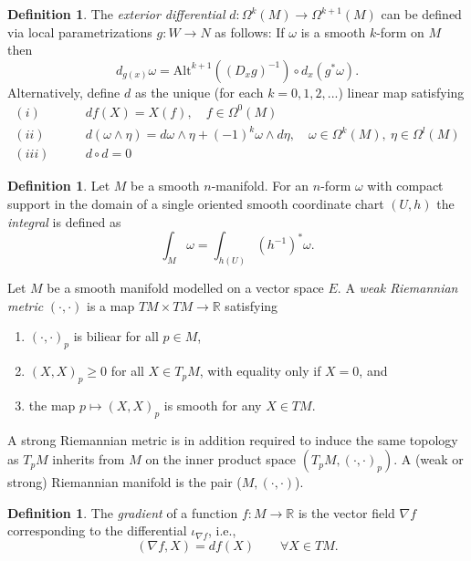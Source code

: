 \documentclass{article}
\theoremstyle{plain}
\theoremstyle{definition}
\newtheorem{defin}[teo]{Definition}
\numberwithin{equation}{section}
\newcommand{\R}{\ensuremath{\mathbb{R}}}
\newcommand{\Alt}{\ensuremath{\mathrm{Alt}}}
\begin{document}
\begin{defin}
	The \textit{exterior differential} $d:\Omega^k(M)\to \Omega^{k+1}(M)$ can be defined via local parametrizations $g:W\to N$ as follows: If $\omega$ is a smooth $k$-form on $M$ then
	\[
	d_{g(x)}\omega= \Alt^{k+1}\left((D_xg)^{-1}\right)\circ d_x(g^*\omega).
	\]
	Alternatively, define $d$ as the unique (for each $k=0,1,2,...$) linear map satisfying
	\begin{align*}
	(i)\qquad & df(X)=X(f),\quad f\in\Omega^0(M)\\
	(ii)\qquad & d(\omega\wedge \eta)=d\omega\wedge \eta + (-1)^k\omega\wedge d\eta,\quad \omega\in\Omega^k(M),\ \eta\in\Omega^l(M)\\
	(iii)\qquad & d\circ d=0
	\end{align*}
\end{defin}


\begin{defin}
	Let $M$ be a smooth $n$-manifold. For an $n$-form $\omega$ with compact support in the domain of a single oriented smooth coordinate chart $(U,h)$ the \textit{integral} is defined as 
	\[
	\int_M\omega = \int_{h(U)}\left(h^{-1}\right)^*\omega.
	\] 
\end{defin}

Let $M$ be a smooth manifold   modelled on a vector space $E$. A \textit{weak Riemannian metric} $(\cdot,\cdot)$ is a map $TM\times TM\to\R$ satisfying 
%
\begin{enumerate}
	\item $(\cdot,\cdot)_p$ is biliear for all $p\in M$, 
	\item $(X,X)_p\geq 0$ for all $X\in T_pM$, with equality only if $X=0$, and
	\item the map $p\mapsto (X,X)_p$ is smooth for any $X\in TM$. 
\end{enumerate}
%
A strong Riemannian metric is in addition required to induce the same topology as $T_pM$ inherits from $M$ on the inner product space $\left(T_pM,(\cdot,\cdot)_p\right)$. A (weak or strong) Riemannian manifold is the pair ($M,(\cdot,\cdot)$).

\begin{defin}
	The \textit{gradient} of a function $f:M\to \R$ is the vector field $\nabla f$ corresponding to the differential $\iota_{\nabla f}$, i.e., %
	\[
	(\nabla f,X)=df(X)\qquad \forall X\in TM.
	\]
\end{defin}
\end{document}
